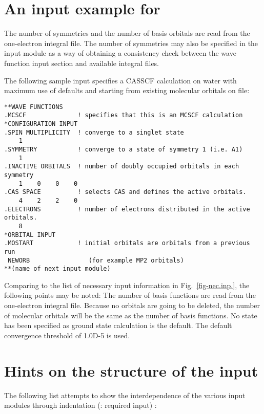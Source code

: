 \section{\label{sec:si-ex} An input example for \sirius}

\noindent
The number of symmetries and the number of basis orbitals are read from
the one-electron integral file.  The number of symmetries may also be
specified in the  input module as a way of
obtaining a consistency check between the wave function input section
and available integral files.

\noindent
The following sample input specifies a CASSCF
calculation on water with maximum use of defaults and starting
from existing molecular orbitals on file:

\begin{verbatim}
**WAVE FUNCTIONS
.MCSCF              ! specifies that this is an MCSCF calculation
*CONFIGURATION INPUT
.SPIN MULTIPLICITY  ! converge to a singlet state
    1
.SYMMETRY           ! converge to a state of symmetry 1 (i.e. A1)
    1
.INACTIVE ORBITALS  ! number of doubly occupied orbitals in each symmetry
    1    0    0    0
.CAS SPACE          ! selects CAS and defines the active orbitals.
    4    2    2    0
.ELECTRONS          ! number of electrons distributed in the active orbitals.
    8                  
*ORBITAL INPUT
.MOSTART            ! initial orbitals are orbitals from a previous run
 NEWORB                (for example MP2 orbitals)
**(name of next input module)
\end{verbatim}

\noindent
Comparing to the list of necessary input information in
Fig.~\ref{fig-nec.inp.},
the following points may be noted:
\noindent
The number of basis functions are read from the one-electron integral
file. Because no orbitals are going to be deleted, the number of
molecular orbitals will be the same as the number of basis functions.
\noindent
No state has been specified as ground state calculation is the default.
\noindent
The default convergence threshold of
1.0D-5 is used.


\section{\label{sec:ig_hints} Hints on the structure of the  input}


The following list attempts to show the interdependence of the various
input modules through indentation
(: required input) :

